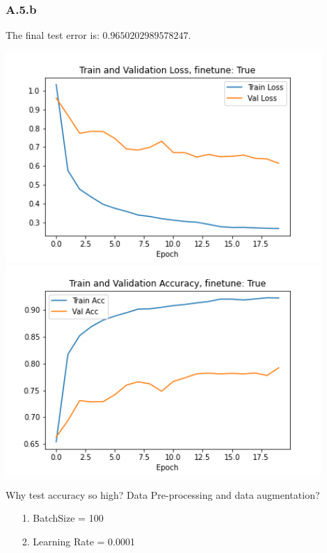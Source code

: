 \documentclass[]{article}
\begin{document}
    \subsubsection*{A.5.b}
        The final test error is: $0.9650202989578247$. 
        \begin{center}
            \includegraphics[width=12cm]{a5plots/A5a-train-val-loss-True1.png}
            \includegraphics[width=12cm]{a5plots/A5a-train-val-acc-True1.png}
        \end{center}
        Why test accuracy so high? Data Pre-processing and data augmentation? 
        \begin{enumerate}
            \item[1.] BatchSize = 100
            \item[2.] Learning Rate = 0.0001 
        \end{enumerate}
\end{document}
